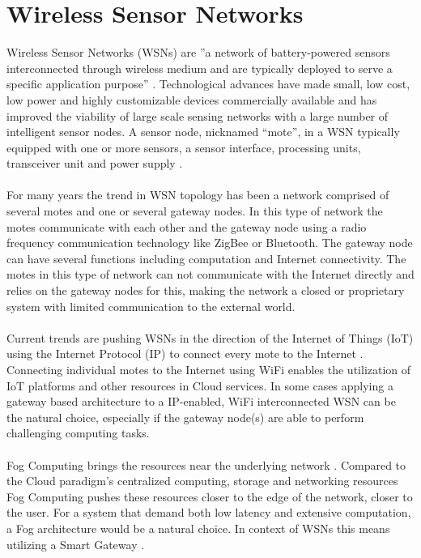 \documentclass[]{uiophd}
\begin{document}
\section{Wireless Sensor Networks}
Wireless Sensor Networks (WSNs) are ''a network of battery-powered sensors interconnected through wireless medium and are typically deployed to serve a specific application purpose'' \cite[p.~68]{Ojha2015662}. Technological advances have made small, low cost, low power and highly customizable devices commercially available and has improved the viability of large scale sensing networks with a large number of intelligent sensor nodes. A sensor node, nicknamed “mote”, in a WSN typically equipped with one or more sensors, a sensor interface, processing units, transceiver unit and power supply \cite{Gubbi20131645}.
\\\\
For many years the trend in WSN topology has been a network comprised of several motes and one or several gateway nodes. In this type of network the motes communicate with each other and the gateway node using a radio frequency communication technology like ZigBee or Bluetooth. The gateway node can have several functions including computation and Internet connectivity. The motes in this type of network can not communicate with the Internet directly and relies on the gateway nodes for this, making the network a closed or proprietary system with limited communication to the external world. 
\\\\
Current trends are pushing WSNs in the direction of the Internet of Things (IoT) using the Internet Protocol (IP) to connect every mote to the Internet \cite{6064380}. Connecting individual motes to the Internet using WiFi enables the utilization of IoT platforms and other resources in Cloud services. In some cases applying a gateway based architecture to a IP-enabled, WiFi interconnected WSN can be the natural choice, especially if the gateway node(s) are able to perform challenging computing tasks.
\\\\
Fog Computing brings the resources near the underlying network \cite{Fog}. Compared to the Cloud paradigm's centralized computing, storage and networking resources Fog Computing pushes these resources closer to the edge of the network, closer to the user. For a system that demand both low latency and extensive computation, a Fog architecture would be a natural choice. In context of WSNs this means utilizing a Smart Gateway \cite{Fog}. 
\end{document}
